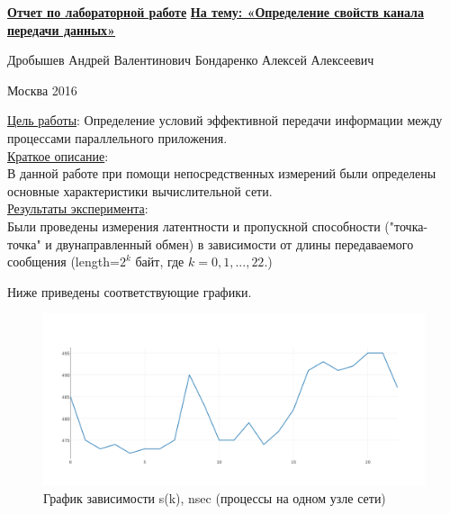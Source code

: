 \documentclass[12pt]{article}
\begin{document}
	\topskip=0mm
	\vspace*{6cm}
	\begin{center}
		\textbf{\Large {\underline{Отчет по лабораторной работе}}}
		\textbf{\Large {\underline{На тему: «Определение свойств канала передачи данных»}}}
	\end{center}
	
	\vspace*{80mm}
	
	 \hspace{70mm} {Дробышев Андрей Валентинович}
	 \hspace{73mm} {Бондаренко Алексей Алексеевич}
	
	\vspace*{\fill} 
	\begin{center}
		Москва 2016
	\end{center}	
	\newpage
	
	\underline{Цель работы}: Определение условий эффективной передачи информации между процессами параллельного
приложения. \\ \medskip 
	\underline{Краткое описание}:\\
		\qquad В данной работе при помощи непосредственных измерений были определены основные характеристики вычислительной сети. \\ \medskip
	\underline{Результаты эксперимента}:\\
		\qquad Были проведены измерения латентности и пропускной способности ("точка-точка" и двунаправленный обмен) в зависимости от длины передаваемого сообщения (length=$2^{k}$ байт, где $k=0, 1, ..., 22$.)\\ \bigskip
		
	Ниже приведены соответствующие графики.
	\begin{figure}[H]
		\centering
		\includegraphics[scale=0.4]{./graphs/lat_int.png}
		\caption{График зависимости s(k), nsec (процессы на одном узле сети)}
		\captionsetup{labelformat=empty}
	\end{figure}
	
\end{document}
